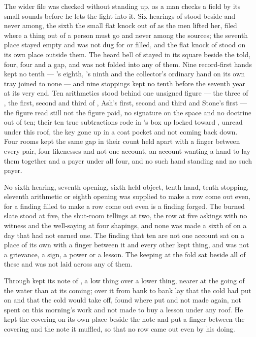 The wider file was checked without standing up, as a man checks a field by its small sounds before he lets the light into it. Six hearings of  stood beside and never among, the sixth the small flat knock out of  as the men lifted her, filed where a thing out of a person must go and never among the sources; the seventh place stayed empty and was not dug for or filled, and the flat knock of  stood on its own place outside them. The heard bell of  stayed in its square beside the told, four, four and a gap, and was not folded into any of them. Nine record-first hands kept no tenth — 's eighth, 's ninth and the collector's ordinary hand on its own tray joined to none — and nine stoppings kept no tenth before the seventh year at its very end. Ten arithmetics stood behind one unsigned figure — the three of , the first, second and third of , Ash's first, second and third and Stone's first — the figure read still not the figure paid, no signature on the space and no doctrine out of ten; their ten true subtractions rode in 's box up  locked toward , unread under this roof, the key gone up in a coat pocket and not coming back down. Four rooms kept the same gap in their count held apart with a finger between every pair, four likenesses and not one account, an account wanting a hand to lay them together and a payer under all four, and no such hand standing and no such payer.

No sixth hearing, seventh opening, sixth held object, tenth hand, tenth stopping, eleventh arithmetic or eighth opening was supplied to make a row come out even, for a finding filled to make a row come out even is a finding forged. The burned slate stood at five, the shut-room tellings at two, the row at five askings with no witness and the well-saying at four shapings, and none was made a sixth of on a day that had not earned one. The finding that ten are not one account sat on a place of its own with a finger between it and every other kept thing, and was not a grievance, a sign, a power or a lesson. The keeping at the fold sat beside all of these and was not laid across any of them.

\scenebreak

Through   kept its note of , a low thing over a lower thing, nearer at the going of the water than at its coming; over it from bank to bank lay  that the cold had put on and that the cold would take off, found where put and not made again, not spent on this morning's work and not made to buy a lesson under any roof. He kept the covering on its own place beside the note and put a finger between the covering and the note it muffled, so that no row came out even by his doing.

